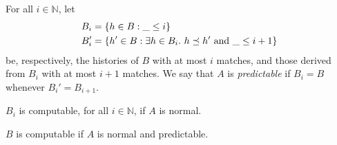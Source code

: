 For all $i \in \mathbb{N}$, let
\begin{align*}
  B_i &= {\{{ h \in B : \_ \le i }\}} \\
  B_i' &= {\{{ h' \in B :
    \exists h \in B_i.\ h \preceq h' \text{ and } \_ \le i+1
  }\}}
\end{align*}
be, respectively, the histories of $B$ with at most $i$ matches, and those
derived from $B_i$ with at most $i\!+\!1$ matches. We say that $A$ is
\emph{predictable} if $B_i = B$ whenever $B_i' = B_{i+1}$.

\begin{lemma}

  $B_i$ is computable, for all $i \in \mathbb{N}$, if $A$ is normal.

\end{lemma}

\begin{lemma}

  $B$ is computable if $A$ is normal and predictable.

\end{lemma}
